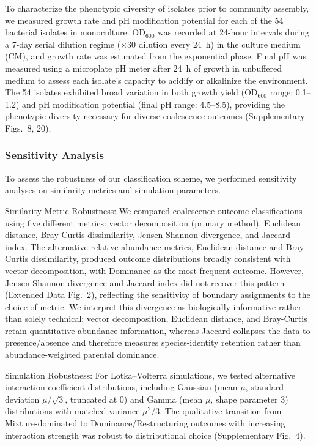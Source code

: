 To characterize the phenotypic diversity of isolates prior to community assembly, we measured growth rate and pH modification potential for each of the 54 bacterial isolates in monoculture. OD$_{600}$ was recorded at 24-hour intervals during a 7-day serial dilution regime ($\times$30 dilution every 24~h) in the culture medium (CM), and growth rate was estimated from the exponential phase. Final pH was measured using a microplate pH meter after 24~h of growth in unbuffered medium to assess each isolate's capacity to acidify or alkalinize the environment.  The 54 isolates exhibited broad variation in both growth yield (OD$_{600}$ range: 0.1--1.2) and pH modification potential (final pH range: 4.5--8.5), providing the phenotypic diversity necessary for diverse coalescence outcomes (Supplementary Figs.~8, 20).


\subsubsection*{Sensitivity Analysis}
\label{sec:suppl:sensitivity}

To assess the robustness of our classification scheme, we performed sensitivity analyses on similarity metrics and simulation parameters.

Similarity Metric Robustness: We compared coalescence outcome classifications using five different metrics: vector decomposition (primary method), Euclidean distance, Bray-Curtis dissimilarity, Jensen-Shannon divergence, and Jaccard index. The alternative relative-abundance metrics, Euclidean distance and Bray-Curtis dissimilarity, produced outcome distributions broadly consistent with vector decomposition, with Dominance as the most frequent outcome. However, Jensen-Shannon divergence and Jaccard index did not recover this pattern (Extended Data Fig.~2), reflecting the sensitivity of boundary assignments to the choice of metric. We interpret this divergence as biologically informative rather than solely technical: vector decomposition, Euclidean distance, and Bray-Curtis retain quantitative abundance information, whereas Jaccard collapses the data to presence/absence and therefore measures species-identity retention rather than abundance-weighted parental dominance.

Simulation Robustness: For Lotka--Volterra simulations, we tested alternative interaction coefficient distributions, including Gaussian (mean $\mu$, standard deviation $\mu/\sqrt{3}$, truncated at 0) and Gamma (mean $\mu$, shape parameter 3) distributions with matched variance $\mu^2/3$. The qualitative transition from Mixture-dominated to Dominance/Restructuring outcomes with increasing interaction strength was robust to distributional choice (Supplementary Fig.~4).
